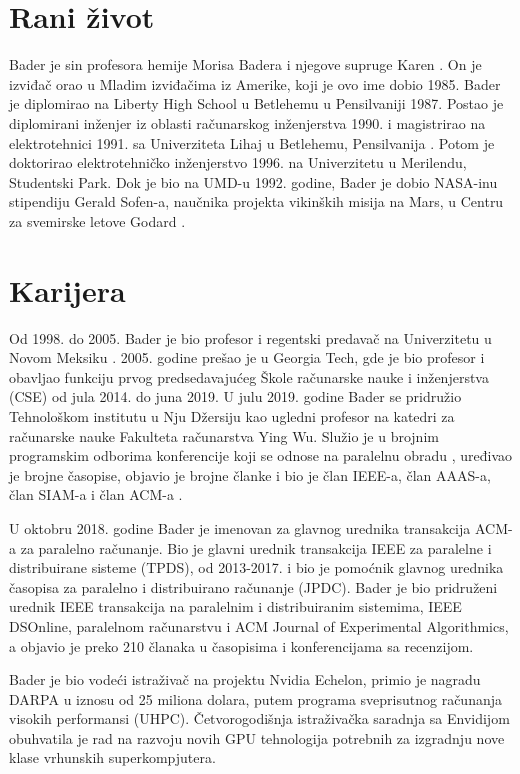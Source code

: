 \documentclass[a4paper]{article}
\begin{document}
{\newpage


\section{Rani život}
Bader je sin profesora hemije Morisa Badera i njegove supruge Karen \cite{kar}. On je izviđač orao u Mladim izviđačima iz Amerike, koji je ovo ime dobio 1985. Bader je diplomirao na Liberty High School u Betlehemu u Pensilvaniji 1987. Postao je diplomirani inženjer iz oblasti računarskog inženjerstva 1990. i magistrirao na elektrotehnici 1991. sa Univerziteta Lihaj u Betlehemu, Pensilvanija  \cite{pen}. Potom je doktorirao elektrotehničko inženjerstvo 1996. na Univerzitetu u Merilendu, Studentski Park. Dok je bio na UMD-u 1992. godine, Bader je dobio NASA-inu stipendiju Gerald Sofen-a, naučnika projekta vikinških misija na Mars, u Centru za svemirske letove Godard \cite{nasa}.

\section{Karijera}
Od 1998. do 2005. Bader je bio profesor i regentski predavač na Univerzitetu u Novom Meksiku \cite{nmex}. 2005. godine prešao je u Georgia Tech, gde je bio profesor i obavljao funkciju prvog predsedavajućeg Škole računarske nauke i inženjerstva (CSE) od jula 2014. do juna 2019. U julu 2019. godine Bader se pridružio Tehnološkom institutu u Nju Džersiju kao ugledni profesor na katedri za računarske nauke Fakulteta računarstva Ying Wu. Služio je u brojnim programskim odborima konferencije koji se odnose na paralelnu obradu \cite{paob}, uređivao je brojne časopise, objavio je brojne članke i bio je član IEEE-a, član AAAS-a, član SIAM-a i član ACM-a \cite{acm}.

U oktobru 2018. godine Bader je imenovan za glavnog urednika transakcija ACM-a za paralelno računanje. Bio je glavni urednik transakcija IEEE za paralelne i distribuirane sisteme (TPDS), od 2013-2017. i bio je pomoćnik glavnog urednika časopisa za paralelno i distribuirano računanje (JPDC). Bader je bio pridruženi urednik IEEE transakcija na paralelnim i distribuiranim sistemima, IEEE DSOnline, paralelnom računarstvu i ACM Journal of Experimental Algorithmics, a objavio je preko 210 članaka u časopisima i konferencijama sa recenzijom.

Bader je bio vodeći istraživač na projektu Nvidia Echelon, primio je nagradu DARPA u iznosu od 25 miliona dolara, putem programa sveprisutnog računanja visokih performansi (UHPC). Četvorogodišnja istraživačka saradnja sa Envidijom obuhvatila je rad na razvoju novih GPU tehnologija potrebnih za izgradnju nove klase vrhunskih superkompjutera.

}
\end{document}
